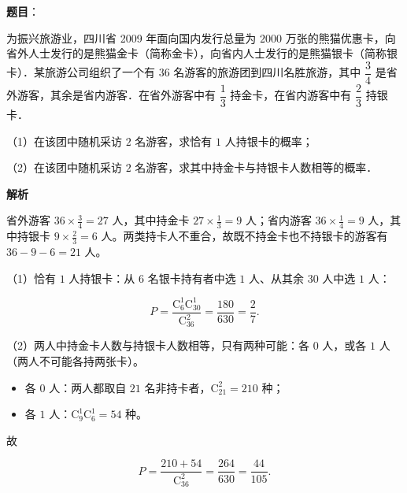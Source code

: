 \begin{answer}

\textbf{题目}：

为振兴旅游业，四川省 2009 年面向国内发行总量为 $2000$ 万张的熊猫优惠卡，向省外人士发行的是熊猫金卡（简称金卡），向省内人士发行的是熊猫银卡（简称银卡）．某旅游公司组织了一个有 $36$ 名游客的旅游团到四川名胜旅游，其中 $\dfrac34$ 是省外游客，其余是省内游客．在省外游客中有 $\dfrac13$ 持金卡，在省内游客中有 $\dfrac23$ 持银卡．

（1）在该团中随机采访 $2$ 名游客，求恰有 $1$ 人持银卡的概率；

（2）在该团中随机采访 $2$ 名游客，求其中持金卡与持银卡人数相等的概率．

\textbf{解析}

省外游客 $36\times\frac34=27$ 人，其中持金卡 $27\times\frac13=9$ 人；省内游客 $36\times\frac14=9$ 人，其中持银卡 $9\times\frac23=6$ 人。两类持卡人不重合，故既不持金卡也不持银卡的游客有 $36-9-6=21$ 人。

（1）恰有 $1$ 人持银卡：从 $6$ 名银卡持有者中选 $1$ 人、从其余 $30$ 人中选 $1$ 人：

\nopagebreak[4]
\[P=\frac{\mathrm C_6^1\mathrm C_{30}^1}{\mathrm C_{36}^2}=\frac{180}{630}=\frac27 .\]

（2）两人中持金卡人数与持银卡人数相等，只有两种可能：各 $0$ 人，或各 $1$ 人（两人不可能各持两张卡）。

\begin{itemize}
\item 各 $0$ 人：两人都取自 $21$ 名非持卡者，$\mathrm C_{21}^2=210$ 种；
\item 各 $1$ 人：$\mathrm C_9^1\mathrm C_6^1=54$ 种。
\end{itemize}

故

\nopagebreak[4]
\[P=\frac{210+54}{\mathrm C_{36}^2}=\frac{264}{630}=\frac{44}{105} .\]


\end{answer}
